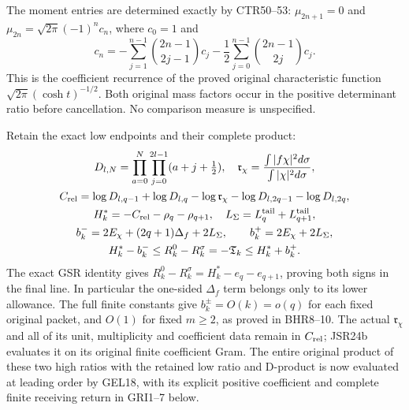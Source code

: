 \documentclass[11pt,a4paper]{article}
\begin{document}
The moment entries are determined exactly by CTR50--53:
$\mu_{2n+1}=0$ and $\mu_{2n}=\sqrt{2\pi}(-1)^nc_n$,
where $c_0=1$ and
\begin{equation}
 c_n=-\sum_{j=1}^{n-1}\binom{2n-1}{2j-1}c_j
          -\frac12\sum_{j=0}^{n-1}\binom{2n-1}{2j}c_j.
\end{equation}
This is the coefficient recurrence of the proved original
characteristic function $\sqrt{2\pi}(\cosh t)^{-1/2}$.
Both original mass factors occur in the positive determinant
ratio before cancellation. No comparison measure is unspecified.

Retain the exact low endpoints and their complete product:
\begin{equation}
\begin{gathered}
 D_{l,N}=\prod_{a=0}^N\prod_{j=0}^{2l-1}(a+j+\tfrac12),\quad
 \mathfrak r_\chi=\frac{\int|f\chi|^2d\sigma}{\int|\chi|^2d\sigma},\\
 C_{\rm rel}=\log D_{l,q-1}+\log D_{l,q}
 -\log\mathfrak r_\chi-\log D_{l,2q-1}-\log D_{l,2q},\\
 H_k^*=-C_{\rm rel}-\rho_q-\rho_{q+1},\quad
 L_\Sigma=L_q^{\rm tail}+L_{q+1}^{\rm tail},\\
 b_k^-=2E_\chi+(2q+1)\Delta_f+2L_\Sigma,\qquad
 b_k^+=2E_\chi+2L_\Sigma,\\
 H_k^*-b_k^-\leq R_k^0-R_k^\sigma=-\mathfrak T_k
                         \leq H_k^*+b_k^+.
\end{gathered}\label{eq:universal-return}
\end{equation}
The exact GSR identity gives
$R_k^0-R_k^\sigma=H_k^*-e_q-e_{q+1}$, proving both
signs in the final line. In particular the one-sided
$\Delta_f$ term belongs only to its lower allowance.
The full finite constants give $b_k^\pm=O(k)=o(q)$ for
each fixed original packet, and $O(1)$ for fixed $m\geq2$,
as proved in BHR8--10. The actual $\mathfrak r_\chi$ and
all of its unit, multiplicity and coefficient data remain
in $C_{\rm rel}$; JSR24b evaluates it on its original finite
coefficient Gram. The entire original product of these two
high ratios with the retained low ratio and D-product is now
evaluated at leading order by GEL18, with its explicit positive
coefficient and complete finite receiving return in GRI1--7 below.
\end{document}
